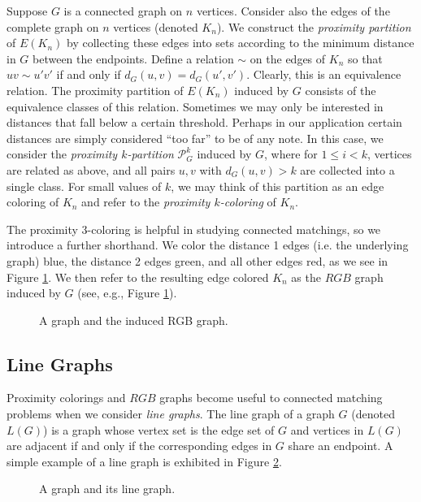 Suppose $G$ is a connected graph on $n$ vertices. Consider also the edges of the complete graph on $n$ vertices (denoted $K_n$).  We construct the {\it proximity partition} of $E(K_n)$ by collecting these edges into sets according to the minimum distance in $G$ between the endpoints.  Define a relation $\sim$ on the edges of $K_n$ so that $uv \sim u'v'$ if and only if $d_G(u,v) = d_G(u',v')$.  Clearly, this is an equivalence relation.  The proximity partition of $E(K_n)$ induced by $G$ consists of the equivalence classes of this relation.
Sometimes we may only be interested in distances that fall below a certain threshold.  Perhaps in our application certain distances are simply considered ``too far'' to be of any note.  In this case, we consider the \textit{proximity $k$-partition} $\mathcal{P}^k_G$ induced by $G$, where for $1 \leq i < k$, vertices are related as above, and all pairs $u,v$ with $d_G(u,v) > k$ are collected into a single class. 
For small values of $k$, we may think of this partition as an edge coloring of $K_n$ and refer to the \textit{proximity $k$-coloring} of $K_n$.

The proximity $3$-coloring is helpful in studying connected matchings, so we introduce a further shorthand.  We color the distance 1 edges (i.e. the underlying graph) blue, the distance 2 edges green, and all other edges red, as we see in Figure \ref{rgb}.  We then refer to the resulting edge colored $K_n$ as the $RGB$ graph induced by $G$ (see, e.g., Figure \ref{rgb}).
\begin{figure}

	\begin{center}
		\hspace{2cm }\hspace{2cm}
		\hspace{2cm}
		\caption{A graph and the induced RGB graph.}
		\label{rgb}
	\end{center}
	\end{figure}

\subsection{Line Graphs}

 Proximity colorings and $RGB$ graphs become useful to connected matching problems when we consider {\it line graphs}.  The line graph of a graph $G$ (denoted $L(G)$) is a graph whose vertex set is the edge set of $G$ and vertices in $L(G)$ are adjacent if and only if the corresponding edges in $G$ share an endpoint. A simple example of a line graph is exhibited in Figure \ref{linegraph}.  
\begin{figure}

	\begin{center}
		\hspace{2cm}
		\hspace{2cm}
		\caption{A graph and its line graph.}
		\label{linegraph}
	\end{center}
	\end{figure}

